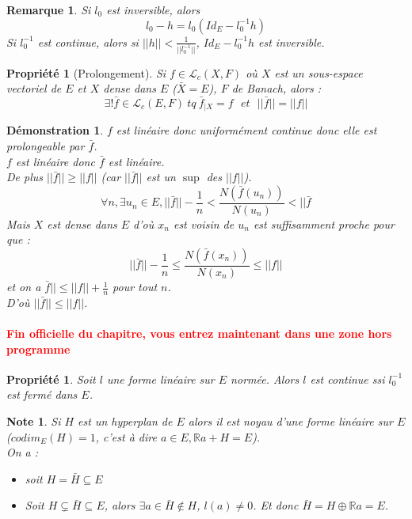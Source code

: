 \documentclass[a4paper, oneside]{report}
\theoremstyle{break}
\newtheorem{propr}[thm]{Propriété}
\newtheorem*{demo}{Démonstration}
\newtheorem{remar}[thm]{Remarque}
\newtheorem{note}[thm]{Note}
\newcommand{\R}{\mathbb{R}}
\renewcommand{\L}{\mathcal{L}}
\newcommand{\sev}{sous-espace vectoriel }
\newcommand{\fracun}[1]{\frac{1}{#1}}
\begin{document}
\begin{remar}
Si $l_0$ est inversible, alors
$$l_0-h=l_0(Id_E-l_0^{-1}h)$$
Si $l_0^{-1}$ est continue, alors si $||h||<\fracun{||l_0^{-1}||}$, $Id_E-l_0^{-1}h$ est inversible.
\end{remar}

\begin{propr}[Prolongement]
Si $f\in \L_c(X,F)$ où $X$ est un \sev de $E$ et $X$ dense dans $E$ ($\bar{X}=E$), $F$ de Banach, alors :
$$\exists ! \bar{f}\in \L_c(E,F)~tq~\bar{f}_{|X}=f~~~et~~~||\bar{f}||=||f||$$
\end{propr}

\begin{demo}
$f$ est linéaire donc uniformément continue donc elle est prolongeable par $\bar{f}$.\\
$f$ est linéaire donc $\bar{f}$ est linéaire.\\
De plus $||\bar{f}||\geq ||f||$ (car $||\bar{f}||$ est un $\sup$ des $||f||$).\\
$$\forall n, \exists u_n\in E, ||\bar{f}||-\fracun{n}<\frac{N(\bar{f}(u_n))}{N(u_n)}<||\bar{f}$$
Mais $X$ est dense dans $E$ d'où $x_n$ est voisin de $u_n$ est suffisamment proche pour que :
$$||\bar{f}||-\fracun{n}\leq \frac{N(\bar{f}(x_n))}{N(x_n)}\leq ||f||$$
et on a $\bar{f}||\leq ||f||+\fracun{n}$ pour tout $n$.\\
D'où $||\bar{f}||\leq ||f||$.
\end{demo}

\paragraph{\textcolor{red}{Fin officielle du chapitre, vous entrez maintenant dans une zone hors programme}}

\begin{propr}
\label{propr_continuite}
Soit $l$ une forme linéaire sur $E$ normée. Alors $l$ est continue ssi $l_0^{-1}$ est fermé dans $E$.
\end{propr}

\begin{note}
Si $H$ est un hyperplan de $E$ alors il est noyau d'une forme linéaire sur $E$ ($codim_E(H)=1$, c'est à dire $a\in E, \R a+H=E$).\\
On a :
\begin{itemize}
\item soit $H=\bar{H}\subseteq E$
\item Soit $H\subsetneq \bar{H} \subseteq E$, alors $\exists a \in \bar{H}\notin H$, $l(a)\neq 0$. Et donc $\bar{H}=H\oplus \R a=E$.

\end{itemize}
\end{note}
\end{document}
